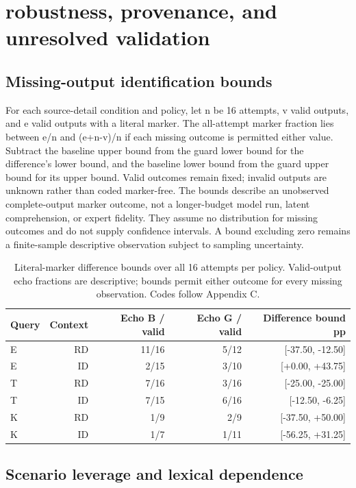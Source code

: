 \documentclass[manuscript,screen,review,anonymous]{acmart}
\begin{document}
\clearpage
\section{robustness, provenance, and unresolved validation}

\subsection{Missing-output identification bounds}

For each source-detail condition and policy, let n be 16 attempts, v valid outputs, and e valid outputs with a literal marker. The all-attempt marker fraction lies between e/n and (e+n-v)/n if each missing outcome is permitted either value. Subtract the baseline upper bound from the guard lower bound for the difference's lower bound, and the baseline lower bound from the guard upper bound for its upper bound. Valid outcomes remain fixed; invalid outputs are unknown rather than coded marker-free. The bounds describe an unobserved complete-output marker outcome, not a longer-budget model run, latent comprehension, or expert fidelity. They assume no distribution for missing outcomes and do not supply confidence intervals. A bound excluding zero remains a finite-sample descriptive observation subject to sampling uncertainty.
\begin{table}[htbp]
\caption{Literal-marker difference bounds over all 16 attempts per policy. Valid-output echo fractions are descriptive; bounds permit either outcome for every missing observation. Codes follow Appendix C.}
\label{tab:missing-bounds}
\centering
\begin{tabular}{@{}lrrrr@{}}
\toprule
Query & Context & Echo B / valid & Echo G / valid & Difference bound pp \\
\midrule
E & RD & 11/16 & 5/12 & [-37.50, -12.50] \\
E & ID & 2/15 & 3/10 & [+0.00, +43.75] \\
T & RD & 7/16 & 3/16 & [-25.00, -25.00] \\
T & ID & 7/15 & 6/16 & [-12.50, -6.25] \\
K & RD & 1/9 & 2/9 & [-37.50, +50.00] \\
K & ID & 1/7 & 1/11 & [-56.25, +31.25] \\
\bottomrule
\end{tabular}
\end{table}

\subsection{Scenario leverage and lexical dependence}
\end{document}
